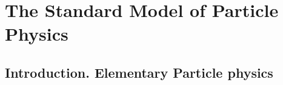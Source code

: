 \chapter{The Standard Model of Particle Physics}\label{chapt:SM}


\section{Introduction. Elementary Particle physics}

% 
% 


